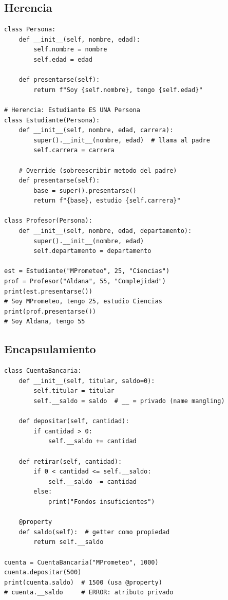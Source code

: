 \documentclass[10pt,a4paper]{article}
\begin{document}
\subsection*{Herencia}

\begin{lstlisting}
class Persona:
    def __init__(self, nombre, edad):
        self.nombre = nombre
        self.edad = edad

    def presentarse(self):
        return f"Soy {self.nombre}, tengo {self.edad}"

# Herencia: Estudiante ES UNA Persona
class Estudiante(Persona):
    def __init__(self, nombre, edad, carrera):
        super().__init__(nombre, edad)  # llama al padre
        self.carrera = carrera

    # Override (sobreescribir metodo del padre)
    def presentarse(self):
        base = super().presentarse()
        return f"{base}, estudio {self.carrera}"

class Profesor(Persona):
    def __init__(self, nombre, edad, departamento):
        super().__init__(nombre, edad)
        self.departamento = departamento

est = Estudiante("MPrometeo", 25, "Ciencias")
prof = Profesor("Aldana", 55, "Complejidad")
print(est.presentarse())
# Soy MPrometeo, tengo 25, estudio Ciencias
print(prof.presentarse())
# Soy Aldana, tengo 55
\end{lstlisting}

\subsection*{Encapsulamiento}

\begin{lstlisting}
class CuentaBancaria:
    def __init__(self, titular, saldo=0):
        self.titular = titular
        self.__saldo = saldo  # __ = privado (name mangling)

    def depositar(self, cantidad):
        if cantidad > 0:
            self.__saldo += cantidad

    def retirar(self, cantidad):
        if 0 < cantidad <= self.__saldo:
            self.__saldo -= cantidad
        else:
            print("Fondos insuficientes")

    @property
    def saldo(self):  # getter como propiedad
        return self.__saldo

cuenta = CuentaBancaria("MPrometeo", 1000)
cuenta.depositar(500)
print(cuenta.saldo)  # 1500 (usa @property)
# cuenta.__saldo     # ERROR: atributo privado
\end{lstlisting}
\end{document}
